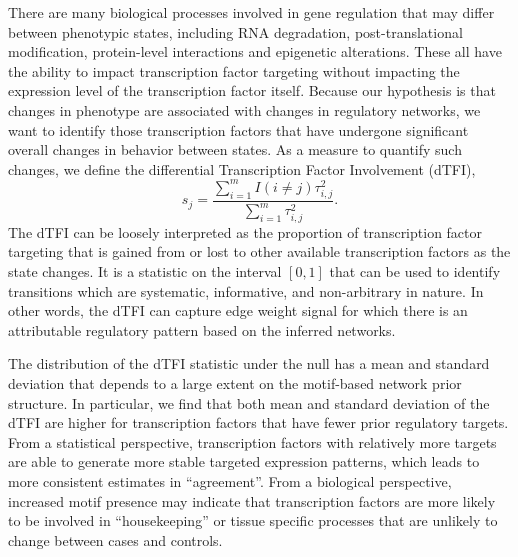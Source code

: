 There are many biological processes involved in gene regulation that may differ between phenotypic states, including RNA degradation, post-translational modification, protein-level interactions and epigenetic alterations. These all have the ability to impact transcription factor targeting without impacting the expression level of the transcription factor itself. Because our hypothesis is that changes in phenotype are associated with changes in regulatory networks, we want to identify those transcription factors that have undergone significant overall changes in behavior between states.  As a measure to quantify such changes, we define the differential Transcription Factor Involvement (dTFI), 
\[
s_{j}=\frac{\sum_{i=1}^{m}I\left(i\ne j\right)\tau_{i,j}^{2}}{\sum_{i=1}^{m}\tau_{i,j}^{2}}.
\]
The dTFI can be loosely interpreted as the proportion of transcription factor targeting that is gained from or lost to other available transcription factors as the state changes.  It is a statistic on the interval $[0,1]$ that can be used to identify transitions which are systematic, informative, and non-arbitrary in nature. In other words, the dTFI can  capture edge weight signal for which there is an attributable regulatory pattern based on the inferred networks.

The distribution of the dTFI statistic under the null has a mean and standard deviation that depends to a large extent on the motif-based network prior structure. In particular, we find that both mean and standard deviation of the dTFI are higher for transcription factors that have fewer prior regulatory targets. From a statistical perspective, transcription factors with relatively more targets are able to generate more stable targeted expression patterns, which leads to more consistent estimates in ``agreement''. From a biological perspective, increased motif presence may indicate that  transcription factors are more likely to be involved in ``housekeeping'' or tissue specific processes that are unlikely to change between cases and controls. 

